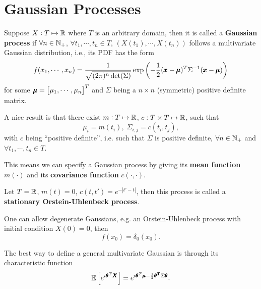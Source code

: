 \section{Gaussian Processes}

\begin{definition}
    Suppose $X: T \mapsto \mathbb{R}$ where $T$ is an arbitrary domain, then it is called a \textbf{Gaussian process} if $\forall n \in \mathbb{N}_+$, $\forall t_1, \cdots, t_n \in T$, $(X(t_1), \cdots, X(t_n))$ follows a multivariate Gaussian distribution, i.e., its PDF has the form 
    \begin{equation*}
        f(x_1, \cdots, x_n) = \frac{1}{\sqrt{(2\pi)^n \det (\Sigma)}} \exp \left( - \frac{1}{2} (\pmb{x} - \pmb{\mu})^T \Sigma^{-1} (\pmb{x} - \pmb{\mu}) \right)
    \end{equation*}
    for some $\pmb{\mu} = \begin{bmatrix}
        \mu_1, \cdots, \mu_n
    \end{bmatrix}^T$ and $\Sigma$ being a $n \times n$ (symmetric) positive definite matrix.
\end{definition}

\begin{proposition}
    A nice result is that there exist $m: T \mapsto \mathbb{R}$, $c: T \times T \mapsto \mathbb{R}$, such that 
    \begin{equation*}
        \mu_i = m(t_i), \; \Sigma_{i,j} = c(t_i, t_j),
    \end{equation*}
    with $c$ being ``positive definite'', i.e. such that $\Sigma$ is positive definite, $\forall n \in \mathbb{N}_+$ and $\forall t_1, \cdots, t_n \in T$.

    This means we can specify a Gaussian process by giving its \textbf{\textcolor{myblue}{mean function}} $m(\cdot)$ and its \textbf{\textcolor{myblue}{covariance function}} $c(\cdot, \cdot)$.
\end{proposition}

\begin{example}
    Let $T = \mathbb{R}$, $m(t) = 0$, $c(t, t') = e^{-|t'-t|}$, then this process is called a \textbf{stationary Orstein-Uhlenbeck process}.
\end{example}

\begin{remark}
    One can allow degenerate Gaussians, e.g. an Orstein-Uhlenbeck process with initial condition $X(0) = 0$, then 
    \begin{equation*}
        f(x_0) = \delta_0 (x_0).
    \end{equation*}

    The best way to define a general multivariate Gaussian is through its characteristic function 
    \begin{equation*}
        \mathbb{E} \left[ e^{i \pmb{\theta}^T \pmb{X}} \right] = e^{i \pmb{\theta}^T \pmb{\mu} - \frac{1}{2} \pmb{\theta^T} \Sigma \pmb{\theta}}.
    \end{equation*}
\end{remark}

